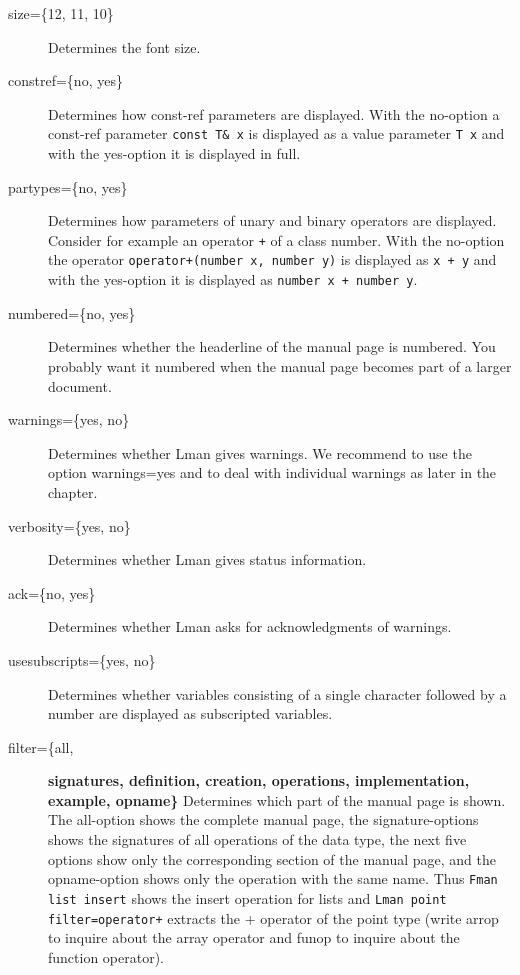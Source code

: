 \begin{description}
\item[size=\{12, 11, 10\}] Determines the font size.

\item[constref=\{no, yes\}] Determines how const-ref parameters are
displayed. With the no-option a const-ref parameter 
\verb-const T& x- is displayed as a value parameter \verb-T x- and
with the yes-option it is displayed in full.

\item[partypes=\{no, yes\}] Determines how parameters of unary and 
binary operators are displayed. Consider for example an operator \verb|+| of a
class number. With the no-option the operator 
\verb|operator+(number x, number y)| is displayed as \verb|x + y| 
and with the yes-option it is displayed as
\verb|number x + number y|.

\item[numbered=\{no, yes\}] Determines whether the headerline of the
manual page is numbered. You probably want it numbered when the manual page
becomes part of a larger document.

\item[warnings=\{yes, no\}] Determines whether Lman gives warnings. 
We recommend to use the option warnings=yes and to deal with individual
warnings as later in the chapter.

\item[verbosity=\{yes, no\}] Determines whether Lman gives status information.  

\item[ack=\{no, yes\}] Determines whether Lman asks for 
acknowledgments of warnings.

\item[usesubscripts=\{yes, no\}] Determines whether variables 
consisting of a single character followed by a number are displayed as
subscripted variables.

\item[filter=\{all,]\textbf{signatures, definition, creation, operations,
implementation, example, opname\}} Determines which part of the manual page is
shown. The all-option shows the complete manual page, the signature-options
shows the signatures of all operations of the data type, the next five options
show only the corresponding section of the manual page, and the opname-option
shows only the operation with the same name. Thus \verb-Fman list insert- shows
the insert operation for lists and \verb-Lman point filter=operator+- extracts
the + operator of the point type (write arrop to inquire about the array
operator and funop to inquire about the function operator).


\end{description}
